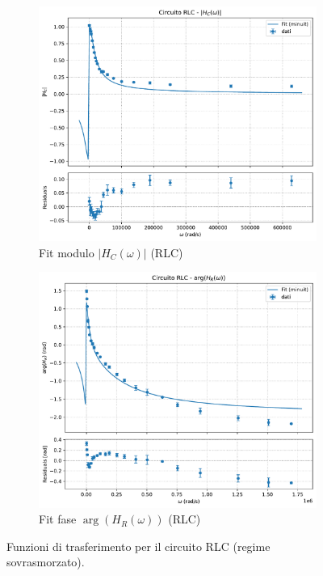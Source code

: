 \documentclass[a4paper]{article}
\begin{document}
\begin{figure}[htbp]
    \vspace{\baselineskip}

    \begin{subfigure}[b]{0.495\textwidth}
        \centering
        \includegraphics[width=\linewidth]{grafici/rlc_hc.pdf}
        \caption{Fit modulo $|H_C(\omega)|$ (RLC)}
        \label{fig:rlc_hc_rlc}
    \end{subfigure}
    \hfill
    \begin{subfigure}[b]{0.495\textwidth}
        \centering
        \includegraphics[width=\linewidth]{grafici/rlc_fase_hr.pdf}
        \caption{Fit fase $\arg(H_R(\omega))$ (RLC)}
        \label{fig:rlc_fase_hr}
    \end{subfigure}

    \caption{Funzioni di trasferimento per il circuito RLC (regime sovrasmorzato).}
    \label{fig:funzioni_trasferimento_rlc}
\end{figure}
\end{document}
